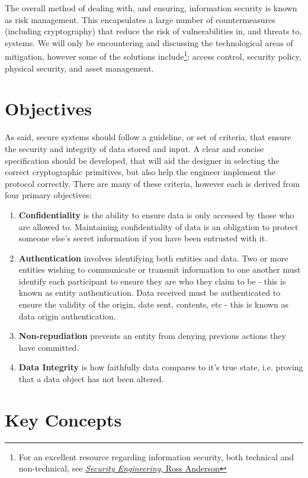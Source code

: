 The overall method of dealing with, and ensuring, information security is known as risk management. This encapsulates a large number of countermeasures (including cryptography) that reduce the risk of vulnerabilities in, and threats to, systems. We will only be encountering and discussing the technological areas of mitigation, however some of the solutions include\footnote{For an excellent resource regarding information security, both technical and non-technical, see \href{http://www.cl.cam.ac.uk/~rja14/book.html}{\emph{Security Engineering}, Ross Anderson}}: access control, security policy, physical security, and asset management.

\section{Objectives}

As said, secure systems should follow a guideline, or set of criteria, that ensure the security and integrity of data stored and input. A clear and concise specification should be developed, that will aid the designer in selecting the correct cryptographic primitives, but also help the engineer implement the protocol correctly. There are many of these criteria, however each is derived from four primary objectives:

\begin{enumerate}
	\item \textbf{Confidentiality} is the ability to ensure data is only accessed by those who are allowed to. Maintaining confidentiality of data is an obligation to protect someone else's secret information if you have been entrusted with it.
	\item \textbf{Authentication} involves identifying both entities and data. Two or more entities wishing to communicate or transmit information to one another must identify each participant to ensure they are who they claim to be - this is known as entity authentication. Data received must be authenticated to ensure the validity of the origin, date sent, contents, etc - this is known as data origin authentication.
	\item \textbf{Non-repudiation} prevents an entity from denying previous actions they have committed.
	\item \textbf{Data Integrity} is how faithfully data compares to it's true state, i.e. proving that a data object has not been altered.
\end{enumerate}

\section{Key Concepts}

